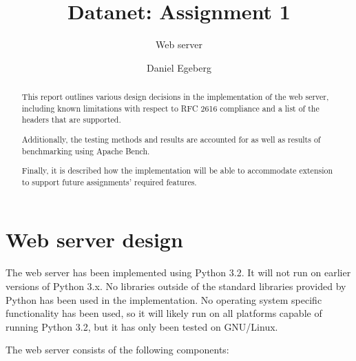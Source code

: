 \documentclass{sig-alternate}
\begin{document}
\title{Datanet: Assignment 1}
\subtitle{Web server}


\author{
\alignauthor
    Daniel Egeberg\\
}

\maketitle

\begin{abstract}
    This report outlines various design decisions in the implementation of
    the web server, including known limitations with respect to RFC 2616
    compliance and a list of the headers that are supported.

    Additionally, the testing methods and results are accounted for as well as
    results of benchmarking using Apache Bench.

    Finally, it is described how the implementation will be able to
    accommodate extension to support future assignments' required features.
\end{abstract}

\section{Web server design}

The web server has been implemented using Python 3.2. It will not run on
earlier versions of Python 3.x. No libraries outside of the standard libraries
provided by Python has been used in the implementation. No operating system
specific functionality has been used, so it will likely run on all platforms
capable of running Python 3.2, but it has only been tested on GNU/Linux.

The web server consists of the following components:
\end{document}
